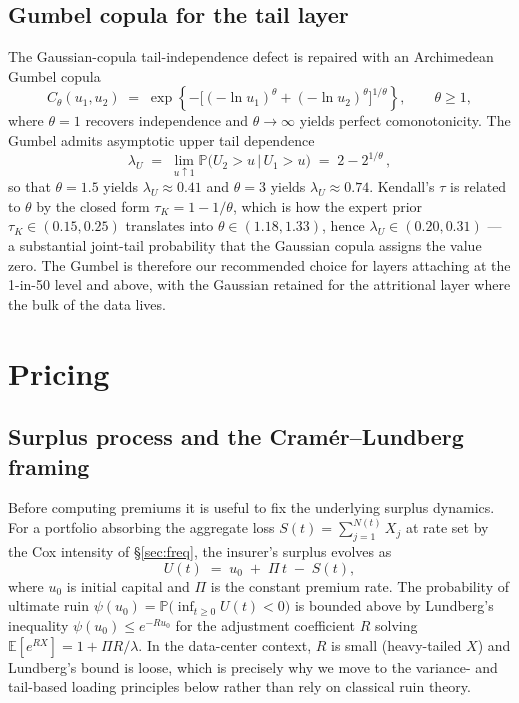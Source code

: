 \documentclass[11pt,a4paper]{article}
\let\origsection\section
\renewcommand{\section}{\clearpage\origsection}
\theoremstyle{ia}
\newcommand{\E}{\mathbb{E}}
\newcommand{\Prb}{\mathbb{P}}
\newcommand{\1}{\mathbf{1}}
\newcommand{\given}{\,\vert\,}
\begin{document}
\subsection{Gumbel copula for the tail layer}\label{ss:gumbel}

The Gaussian-copula tail-independence defect is repaired with an
Archimedean Gumbel copula
\begin{equation}\label{eq:gumbel}
   C_\theta(u_1,u_2) \;=\;
   \exp\!\left\{-\bigl[(-\ln u_1)^{\theta} + (-\ln u_2)^{\theta}\bigr]^{1/\theta}\right\},
   \qquad \theta \ge 1,
\end{equation}
where $\theta=1$ recovers independence and $\theta\to\infty$ yields
perfect comonotonicity. The Gumbel admits asymptotic upper tail
dependence
\begin{equation}\label{eq:lambdaU}
   \lambda_U \;=\; \lim_{u\uparrow 1}
   \Prb\bigl(U_2>u\given U_1>u\bigr)
   \;=\; 2 - 2^{1/\theta}\,,
\end{equation}
so that $\theta=1.5$ yields $\lambda_U\approx 0.41$ and $\theta=3$
yields $\lambda_U\approx 0.74$. Kendall's $\tau$ is related to
$\theta$ by the closed form $\tau_K = 1 - 1/\theta$, which is how the
expert prior $\tau_K\in(0.15,0.25)$ translates into
$\theta\in(1.18,1.33)$, hence $\lambda_U\in(0.20,0.31)$ ---
a substantial joint-tail probability that the Gaussian copula assigns
the value zero. The Gumbel is therefore our recommended choice for
layers attaching at the 1-in-50 level and above, with the Gaussian
retained for the attritional layer where the bulk of the data lives.

\section{Pricing}\label{sec:pricing}

\subsection{Surplus process and the Cram\'er--Lundberg framing}
\label{ss:surplus}

Before computing premiums it is useful to fix the underlying surplus
dynamics. For a portfolio absorbing the aggregate loss
$S(t)=\sum_{j=1}^{N(t)}X_j$ at rate set by the Cox intensity of
\S\ref{sec:freq}, the insurer's surplus evolves as
\begin{equation}\label{eq:CL}
   U(t) \;=\; u_0 \;+\; \Pi\,t \;-\; S(t),
\end{equation}
where $u_0$ is initial capital and $\Pi$ is the constant premium rate.
The probability of ultimate ruin
$\psi(u_0)=\Prb\bigl(\inf_{t\ge 0}U(t)<0\bigr)$ is bounded above by
Lundberg's inequality $\psi(u_0)\le e^{-Ru_0}$ for the adjustment
coefficient $R$ solving $\E[e^{R X}]=1+\Pi R/\lambda$. In the
data-center context, $R$ is small (heavy-tailed $X$) and Lundberg's
bound is loose, which is precisely why we move to the variance- and
tail-based loading principles below rather than rely on classical ruin
theory.
\end{document}
